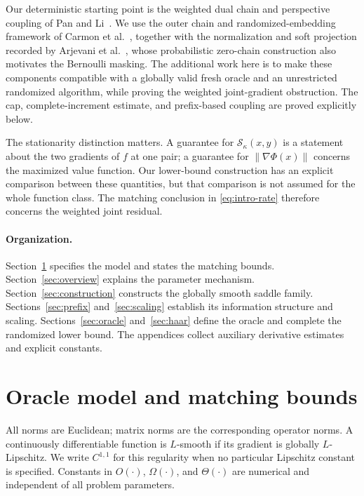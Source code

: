 \documentclass[11pt,a4paper]{article}
\newcommand{\norm}[1]{\left\lVert #1\right\rVert}
\newcommand{\res}{\mathcal S_\kappa}
\theoremstyle{definition}
\theoremstyle{remark}
\numberwithin{equation}{section}
\begin{document}
Our deterministic starting point is the weighted dual chain and
perspective coupling of Pan and Li~\cite{panli}. We use the outer chain
and randomized-embedding framework of Carmon et al.~\cite{carmon},
together with the normalization and soft
projection recorded by Arjevani et al.~\cite{arjevani}, whose
probabilistic zero-chain construction also motivates the Bernoulli
masking. The additional work here is to make these components compatible
with a globally valid fresh oracle and an unrestricted randomized
algorithm, while proving the weighted joint-gradient obstruction.
The cap, complete-increment estimate, and prefix-based coupling are
proved explicitly below.

The stationarity distinction matters. A guarantee for
$\res(x,y)$ is a statement about the two gradients of $f$ at one pair;
a guarantee for $\norm{\nabla\Phi(x)}$ concerns the maximized value
function. Our lower-bound construction has an explicit comparison
between these quantities, but that comparison is not assumed for the
whole function class. The matching conclusion in
\eqref{eq:intro-rate} therefore concerns the weighted joint residual.

\paragraph{Organization.}
Section~\ref{sec:model} specifies the model and states the matching
bounds. Section~\ref{sec:overview} explains the parameter mechanism.
Section~\ref{sec:construction} constructs the globally smooth saddle
family. Sections~\ref{sec:prefix} and~\ref{sec:scaling} establish its
information structure and scaling. Sections~\ref{sec:oracle}
and~\ref{sec:haar} define the oracle and complete the randomized lower
bound. The appendices collect auxiliary derivative estimates and
explicit constants.

\section{Oracle model and matching bounds}
\label{sec:model}

All norms are Euclidean; matrix norms are the corresponding operator
norms. A continuously differentiable function is $L$-smooth if its
gradient is globally $L$-Lipschitz. We write $C^{1,1}$ for this regularity
when no particular Lipschitz constant is specified. Constants in
$O(\cdot)$, $\Omega(\cdot)$, and $\Theta(\cdot)$ are numerical and
independent of all problem parameters.
\end{document}
